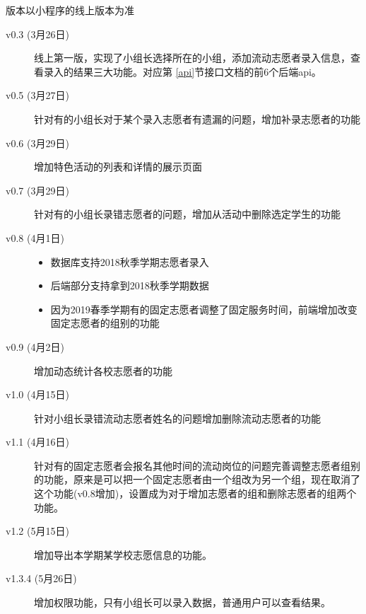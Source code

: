 \documentclass[]{ctexart}
\begin{document}
版本以小程序的线上版本为准
\begin{description}
 \item[v0.3 (3月26日)]

线上第一版，实现了小组长选择所在的小组，添加流动志愿者录入信息，查看录入的结果三大功能。对应第 \ref{api}节接口文档的前6个后端api。

\item[v0.5 (3月27日)]
针对有的小组长对于某个录入志愿者有遗漏的问题，增加补录志愿者的功能

\item[v0.6 (3月29日)]
增加特色活动的列表和详情的展示页面

\item[v0.7 (3月29日)]
针对有的小组长录错志愿者的问题，增加从活动中删除选定学生的功能

\item[v0.8 (4月1日)]
\begin{itemize}
\item
  数据库支持2018秋季学期志愿者录入
\item
  后端部分支持拿到2018秋季学期数据
\item
  因为2019春季学期有的固定志愿者调整了固定服务时间，前端增加改变固定志愿者的组别的功能
\end{itemize}

\item[v0.9 (4月2日)]
增加动态统计各校志愿者的功能
\item[v1.0 (4月15日)]
针对小组长录错流动志愿者姓名的问题增加删除流动志愿者的功能

\item[v1.1 (4月16日)]
针对有的固定志愿者会报名其他时间的流动岗位的问题完善调整志愿者组别的功能，原来是可以把一个固定志愿者由一个组改为另一个组，现在取消了这个功能(v0.8增加)，设置成为对于增加志愿者的组和删除志愿者的组两个功能。

\item[v1.2 (5月15日)]
增加导出本学期某学校志愿信息的功能。

\item[v1.3.4 (5月26日)]
增加权限功能，只有小组长可以录入数据，普通用户可以查看结果。
\end{description}
\end{document}
